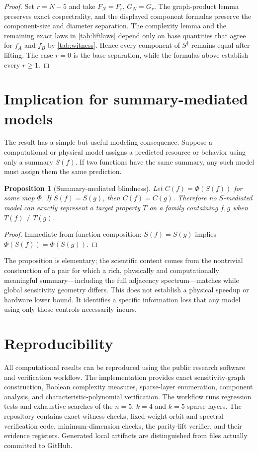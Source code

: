 \documentclass[twoside,12pt,letterpaper]{article}
\newtheorem{proposition}{Proposition}
\theoremstyle{definition}
\begin{document}
\begin{proof}
Set $r=N-5$ and take $F_N=F_r$, $G_N=G_r$. The graph-product lemma preserves exact cospectrality, and the displayed component formulas preserve the component-size and diameter separation. The complexity lemma and the remaining exact laws in \cref{tab:liftlaws} depend only on base quantities that agree for $f_A$ and $f_B$ by \cref{tab:witness}. Hence every component of $S^\dagger$ remains equal after lifting. The case $r=0$ is the base separation, while the formulas above establish every $r\ge1$.
\end{proof}

\section{Implication for summary-mediated models}
The result has a simple but useful modeling consequence. Suppose a computational or physical model assigns a predicted resource or behavior using only a summary $S(f)$. If two functions have the same summary, any such model must assign them the same prediction.

\begin{proposition}[Summary-mediated blindness]
Let $C(f)=\Phi(S(f))$ for some map $\Phi$. If $S(f)=S(g)$, then $C(f)=C(g)$. Therefore no $S$-mediated model can exactly represent a target property $T$ on a family containing $f,g$ when $T(f)\neq T(g)$.
\end{proposition}

\begin{proof}
Immediate from function composition: $S(f)=S(g)$ implies $\Phi(S(f))=\Phi(S(g))$.
\end{proof}

The proposition is elementary; the scientific content comes from the nontrivial construction of a pair for which a rich, physically and computationally meaningful summary---including the full adjacency spectrum---matches while global sensitivity geometry differs. This does not establish a physical speedup or hardware lower bound. It identifies a specific information loss that any model using only those controls necessarily incurs.

\section{Reproducibility}
All computational results can be reproduced using the public research software and verification workflow. The implementation provides exact sensitivity-graph construction, Boolean complexity measures, sparse-layer enumeration, component analysis, and characteristic-polynomial verification. The workflow runs regression tests and exhaustive searches of the $n=5$, $k=4$ and $k=5$ sparse layers. The repository contains exact witness checks, fixed-weight orbit and spectral verification code, minimum-dimension checks, the parity-lift verifier, and their evidence registers. Generated local artifacts are distinguished from files actually committed to GitHub.
\end{document}
